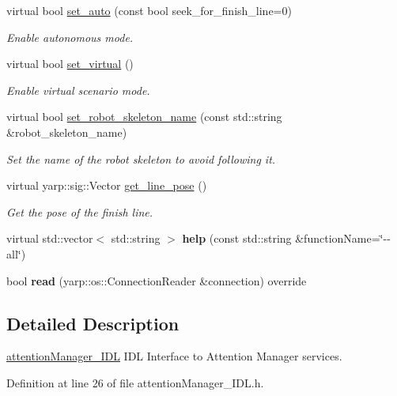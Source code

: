 \begin{DoxyCompactItemize}
virtual bool \hyperlink{classattentionManager__IDL_af154c2ce288ff7ac68618f1c87155e91}{set\+\_\+auto} (const bool seek\+\_\+for\+\_\+finish\+\_\+line=0)
\begin{DoxyCompactList}\small\item\em Enable autonomous mode. \end{DoxyCompactList}\item 
virtual bool \hyperlink{classattentionManager__IDL_a9278a1d0df7c7b1c3b0aa46ef78f8009}{set\+\_\+virtual} ()
\begin{DoxyCompactList}\small\item\em Enable virtual scenario mode. \end{DoxyCompactList}\item 
virtual bool \hyperlink{classattentionManager__IDL_ae50c946fce68f55cac50fe5136e1bc02}{set\+\_\+robot\+\_\+skeleton\+\_\+name} (const std\+::string \&robot\+\_\+skeleton\+\_\+name)
\begin{DoxyCompactList}\small\item\em Set the name of the robot skeleton to avoid following it. \end{DoxyCompactList}\item 
virtual yarp\+::sig\+::\+Vector \hyperlink{classattentionManager__IDL_a6f5a9c4bfb514d44ebc41e16b320a92b}{get\+\_\+line\+\_\+pose} ()
\begin{DoxyCompactList}\small\item\em Get the pose of the finish line. \end{DoxyCompactList}\item 
\mbox{\label{classattentionManager__IDL_ac3c162b2616ec83ecb6f605d79c7b6af}} 
virtual std\+::vector$<$ std\+::string $>$ {\bfseries help} (const std\+::string \&function\+Name=\char`\"{}-\/-\/all\char`\"{})
\item 
\mbox{\label{classattentionManager__IDL_ab7ca0482a77f24b49fa05448fb32ba54}} 
bool {\bfseries read} (yarp\+::os\+::\+Connection\+Reader \&connection) override
\end{DoxyCompactItemize}


\subsection{Detailed Description}
\hyperlink{classattentionManager__IDL}{attention\+Manager\+\_\+\+I\+DL} I\+DL Interface to Attention Manager services. 

Definition at line 26 of file attention\+Manager\+\_\+\+I\+D\+L.\+h.



